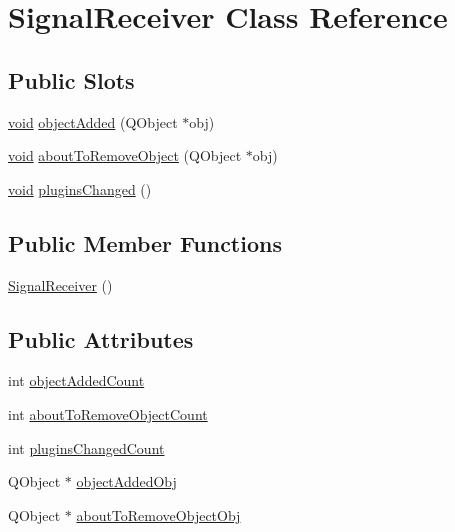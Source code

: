 \hypertarget{class_signal_receiver}{\section{\-Signal\-Receiver \-Class \-Reference}
\label{class_signal_receiver}
}
\subsection*{\-Public \-Slots}
\begin{DoxyCompactItemize}
\item 
\hyperlink{group___u_a_v_objects_plugin_ga444cf2ff3f0ecbe028adce838d373f5c}{void} \hyperlink{class_signal_receiver_a26be1efe883adfad954dbd45c2dcbf98}{object\-Added} (\-Q\-Object $\ast$obj)
\item 
\hyperlink{group___u_a_v_objects_plugin_ga444cf2ff3f0ecbe028adce838d373f5c}{void} \hyperlink{class_signal_receiver_ac98296cb7aa708c66678c80c6437836a}{about\-To\-Remove\-Object} (\-Q\-Object $\ast$obj)
\item 
\hyperlink{group___u_a_v_objects_plugin_ga444cf2ff3f0ecbe028adce838d373f5c}{void} \hyperlink{class_signal_receiver_a5d908f3ffab5986fa3a676641c68d69b}{plugins\-Changed} ()
\end{DoxyCompactItemize}
\subsection*{\-Public \-Member \-Functions}
\begin{DoxyCompactItemize}
\item 
\hyperlink{class_signal_receiver_aa20a1f07b5b88219a40bf0de55df209b}{\-Signal\-Receiver} ()
\end{DoxyCompactItemize}
\subsection*{\-Public \-Attributes}
\begin{DoxyCompactItemize}
\item 
int \hyperlink{class_signal_receiver_a6930c4532fbbbd583414806ebfb5509e}{object\-Added\-Count}
\item 
int \hyperlink{class_signal_receiver_a81ab73157174745619fa9223f49ce09d}{about\-To\-Remove\-Object\-Count}
\item 
int \hyperlink{class_signal_receiver_a38ab4851af216c217c3469c177a85ce3}{plugins\-Changed\-Count}
\item 
\-Q\-Object $\ast$ \hyperlink{class_signal_receiver_a198c9501873f7f4b90f636190fdc266a}{object\-Added\-Obj}
\item 
\-Q\-Object $\ast$ \hyperlink{class_signal_receiver_a6eb3b4bcea370d253baf00da53fdab81}{about\-To\-Remove\-Object\-Obj}
\end{DoxyCompactItemize}


